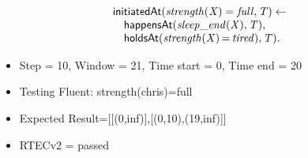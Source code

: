 \documentclass[8pt]{beamer}
\DeclareMathOperator{\val}{=}  %
\def \patsize {}
\def\happensAt{\textsf{\patsize happensAt}}
\def\holdsAt{\textsf{\patsize holdsAt}}
\def\initiatedAt{\textsf{\patsize initiatedAt}}
\newenvironment{mysplit}%
  {\arraycolsep 0pt \begin{array}{l}}%
  {\end{array}}
\begin{document}
\begin{frame}
\begin{minipage}{0.55\linewidth}
\begin{align*}
\begin{mysplit}
                \initiatedAt\mathit{(strength(X)=full,T)\leftarrow}\\
                \quad    \happensAt\mathit{(sleep\_end(X),T),}\\
                \quad    \holdsAt\mathit{(strength(X)\val tired),T).}\\
            \end{mysplit}
        \end{align*}
    \end{minipage}
    \begin{itemize}
        \item  Step = 10, Window = 21, Time start = 0, Time end = 20
        \item Testing Fluent: strength(chris)=full
        \item Expected Result=[[(0,inf)],[(0,10),(19,inf)]]
        \item RTECv2 = passed
    \end{itemize}
\end{frame}
\end{document}
